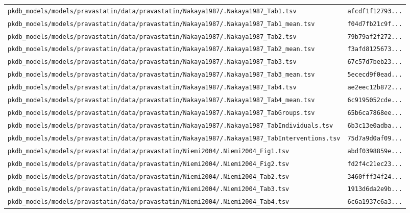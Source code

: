 \documentclass{article}
\begin{document}
\begin{longtable}{ll}
\texttt{pkdb\_models/models/pravastatin/data/pravastatin/Nakaya1987/.Nakaya1987\_Tab1.tsv} & \texttt{afcdf1f12793...} \\
\texttt{pkdb\_models/models/pravastatin/data/pravastatin/Nakaya1987/.Nakaya1987\_Tab1\_mean.tsv} & \texttt{f04d7fb21c9f...} \\
\texttt{pkdb\_models/models/pravastatin/data/pravastatin/Nakaya1987/.Nakaya1987\_Tab2.tsv} & \texttt{79b79af2f272...} \\
\texttt{pkdb\_models/models/pravastatin/data/pravastatin/Nakaya1987/.Nakaya1987\_Tab2\_mean.tsv} & \texttt{f3afd8125673...} \\
\texttt{pkdb\_models/models/pravastatin/data/pravastatin/Nakaya1987/.Nakaya1987\_Tab3.tsv} & \texttt{67c57d7beb23...} \\
\texttt{pkdb\_models/models/pravastatin/data/pravastatin/Nakaya1987/.Nakaya1987\_Tab3\_mean.tsv} & \texttt{5ececd9f0ead...} \\
\texttt{pkdb\_models/models/pravastatin/data/pravastatin/Nakaya1987/.Nakaya1987\_Tab4.tsv} & \texttt{ae2eec12b872...} \\
\texttt{pkdb\_models/models/pravastatin/data/pravastatin/Nakaya1987/.Nakaya1987\_Tab4\_mean.tsv} & \texttt{6c9195052cde...} \\
\texttt{pkdb\_models/models/pravastatin/data/pravastatin/Nakaya1987/.Nakaya1987\_TabGroups.tsv} & \texttt{65b6ca7868ee...} \\
\texttt{pkdb\_models/models/pravastatin/data/pravastatin/Nakaya1987/.Nakaya1987\_TabIndividuals.tsv} & \texttt{6b3c13e0adba...} \\
\texttt{pkdb\_models/models/pravastatin/data/pravastatin/Nakaya1987/.Nakaya1987\_TabInterventions.tsv} & \texttt{75d7a9d0af09...} \\
\texttt{pkdb\_models/models/pravastatin/data/pravastatin/Niemi2004/.Niemi2004\_Fig1.tsv} & \texttt{abdf0398859e...} \\
\texttt{pkdb\_models/models/pravastatin/data/pravastatin/Niemi2004/.Niemi2004\_Fig2.tsv} & \texttt{fd2f4c21ec23...} \\
\texttt{pkdb\_models/models/pravastatin/data/pravastatin/Niemi2004/.Niemi2004\_Tab2.tsv} & \texttt{3460fff34f24...} \\
\texttt{pkdb\_models/models/pravastatin/data/pravastatin/Niemi2004/.Niemi2004\_Tab3.tsv} & \texttt{1913d6da2e9b...} \\
\texttt{pkdb\_models/models/pravastatin/data/pravastatin/Niemi2004/.Niemi2004\_Tab4.tsv} & \texttt{6c6a1937c6a3...} \\

\end{longtable}
\end{document}
